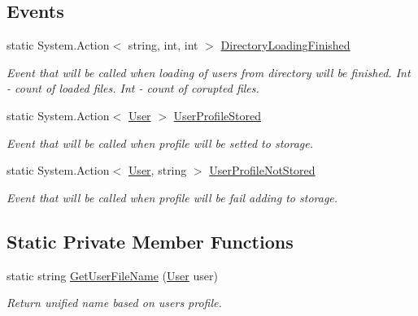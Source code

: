 \subsection*{Events}
\begin{DoxyCompactItemize}
\item 
static System.\+Action$<$ string, int, int $>$ \mbox{\hyperlink{class_authority_controller_1_1_a_p_i_1_1_users_af7bf2041f53bc5910235a72778703786}{Directory\+Loading\+Finished}}
\begin{DoxyCompactList}\small\item\em Event that will be called when loading of users from directory will be finished. Int -\/ count of loaded files. Int -\/ count of corupted files. \end{DoxyCompactList}\item 
static System.\+Action$<$ \mbox{\hyperlink{class_authority_controller_1_1_data_1_1_user}{User}} $>$ \mbox{\hyperlink{class_authority_controller_1_1_a_p_i_1_1_users_a38d89296f7a63c029fe5873e12451ce3}{User\+Profile\+Stored}}
\begin{DoxyCompactList}\small\item\em Event that will be called when profile will be setted to storage. \end{DoxyCompactList}\item 
static System.\+Action$<$ \mbox{\hyperlink{class_authority_controller_1_1_data_1_1_user}{User}}, string $>$ \mbox{\hyperlink{class_authority_controller_1_1_a_p_i_1_1_users_a1f3af72fd317a1786bcf89c4ab55e3a1}{User\+Profile\+Not\+Stored}}
\begin{DoxyCompactList}\small\item\em Event that will be called when profile will be fail adding to storage. \end{DoxyCompactList}\end{DoxyCompactItemize}
\subsection*{Static Private Member Functions}
\begin{DoxyCompactItemize}
\item 
static string \mbox{\hyperlink{class_authority_controller_1_1_a_p_i_1_1_users_ac0cc8d945690970c7bac5432fb9baf11}{Get\+User\+File\+Name}} (\mbox{\hyperlink{class_authority_controller_1_1_data_1_1_user}{User}} user)
\begin{DoxyCompactList}\small\item\em Return unified name based on user\textquotesingle{}s profile. \end{DoxyCompactList}\end{DoxyCompactItemize}
